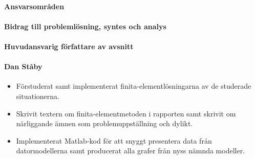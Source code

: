 \documentclass[12pt,a4paper]{article}
\begin{document}
\paragraph{Ansvarsområden}

\paragraph{Bidrag till problemlösning, syntes och analys}

\paragraph{Huvudansvarig författare av avsnitt}

\paragraph{Dan Ståby}
\begin{itemize}
\item Förstuderat samt implementerat finita-elementlösningarna av de studerade situationerna.
\item Skrivit textern om finita-elementmetoden i rapporten samt skrivit om närliggande ämnen som problemuppställning och dylikt. 
\item Implementerat Matlab-kod för att snyggt presentera data från datormodellerna samt producerat alla grafer från
nyss nämnda modeller.
\end{itemize}
\end{document}
